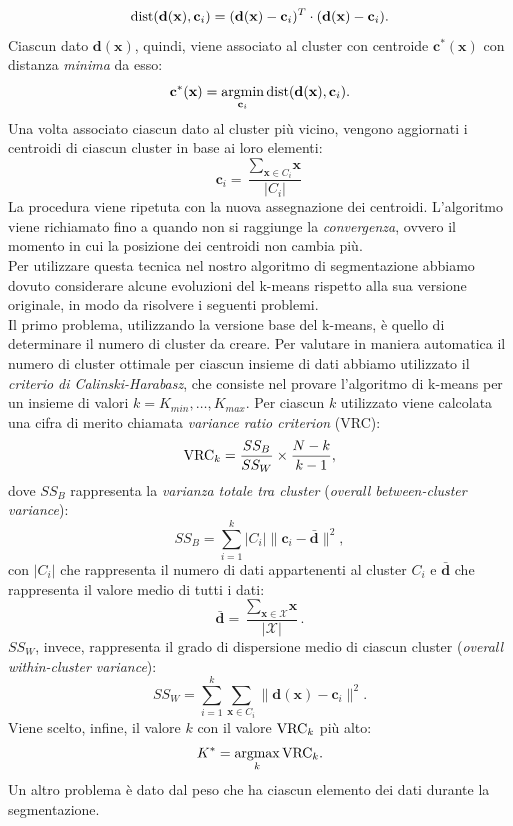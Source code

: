\[\operatorname*{dist}(\textbf{d}(\textbf{x}),\textbf{c}_i)=(\textbf{d}(\textbf{x})- \textbf{c}_i)^T \cdot (\textbf{d}(\textbf{x})- \textbf{c}_i). \]
Ciascun dato $\textbf{d}(\textbf{x})$, quindi, viene associato al cluster con centroide $\textbf{c}^*(\textbf{x})$ con distanza \textit{minima} da esso:
\[\textbf{c}^*(\textbf{x}) = \operatorname*{argmin}_{\textbf{c}_i} \operatorname*{dist}(\textbf{d}(\textbf{x}),\textbf{c}_i). \]
Una volta associato ciascun dato al cluster pi\`u vicino, vengono aggiornati i centroidi di ciascun cluster in base ai loro elementi:
\[ \textbf{c}_i = \frac{\sum_{\textbf{x}\in C_i}\textbf{x}}{|C_i|} \] 
La procedura viene ripetuta con la nuova assegnazione dei centroidi.
L'algoritmo viene richiamato fino a quando non si raggiunge la \textit{convergenza}, ovvero il momento in cui la posizione dei centroidi non cambia pi\`u.\\
Per utilizzare questa tecnica nel nostro algoritmo di segmentazione abbiamo dovuto considerare alcune evoluzioni del k-means rispetto alla sua versione originale, in modo da risolvere i seguenti problemi.\\
Il primo problema, utilizzando la versione base del k-means, \`e quello di determinare il numero di cluster da creare.
Per valutare in maniera automatica il numero di cluster ottimale per ciascun insieme di dati  abbiamo utilizzato il \textit{criterio di Calinski-Harabasz}\cite{calinski1974dendrite}, che consiste nel provare l'algoritmo di k-means per un insieme di valori $k=K_{min},\dots,K_{max}$.
Per ciascun $k$ utilizzato viene calcolata una cifra di merito chiamata \textit{variance ratio criterion} (VRC):
\[{\operatorname*{VRC}}_{k} = \frac{SS_B}{SS_W}\times\frac{N-k}{k-1},\]
dove $SS_B$ rappresenta la \textit{varianza totale tra cluster} (\textit{overall between-cluster variance}):
\[SS_B=\sum_{i=1}^{k}|C_i|\|\textbf{c}_i - \bar{\textbf{d}}\|^2, \]
con $|C_i|$ che rappresenta il numero di dati appartenenti al cluster $C_i$ e $\bar{\textbf{d}}$ che rappresenta il valore medio di tutti  i dati:
\[\bar{\textbf{d}}=\frac{\sum_{\textbf{x}\in \mathcal{X}}\textbf{x}}{|\mathcal{X}|}.\] 
$SS_W$, invece, rappresenta il grado di dispersione medio di ciascun cluster (\textit{overall within-cluster variance}):
\[SS_W = \sum_{i=1}^{k}\sum_{\textbf{x} \in C_i}\|\textbf{d}(\textbf{x})-\textbf{c}_i\|^2.\]
Viene scelto, infine, il valore $k$ con il valore ${\operatorname*{VRC}}_k$ pi\`u alto:
\[K^* = \operatorname*{argmax}_k {\operatorname*{VRC}}_k.\]
Un altro problema \`e dato dal peso che ha ciascun elemento dei dati durante la segmentazione.

